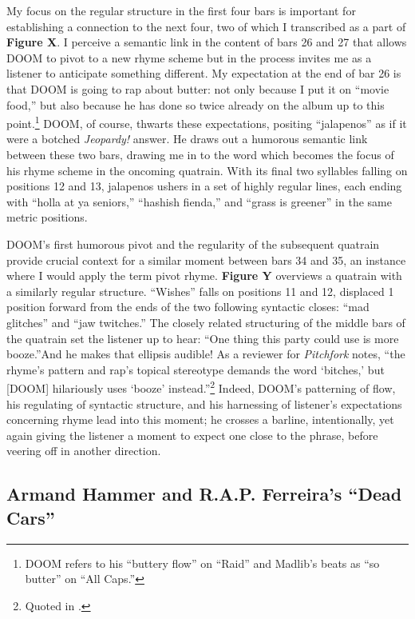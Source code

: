 My focus on the regular structure in the first four bars is important for establishing a connection
to the next four, two of which I transcribed as a part of \textbf{Figure X}. I perceive a semantic 
link in the content of bars 26 and 27 that allows DOOM to pivot to a new rhyme scheme but in the 
process invites me as a listener to anticipate something different. My expectation at the end of 
bar 26 is that DOOM is going to rap about butter: not only because I put it on ``movie food,'' but
also because he has done so twice already on the album up to this point.\footnote{
    DOOM refers to his ``buttery flow'' on ``Raid'' and Madlib's beats as ``so butter'' on ``All 
    Caps.''}
DOOM, of course, thwarts these expectations, positing ``jalapenos'' as if it were a botched 
\textit{Jeopardy!} answer. He draws out a humorous semantic link between these two bars, drawing
me in to the word which becomes the focus of his rhyme scheme in the oncoming quatrain. With its
final two syllables falling on positions 12 and 13, jalapenos ushers in a set of highly regular
lines, each ending with ``holla at ya seniors,'' ``hashish fienda,'' and ``grass is greener''
in the same metric positions.

DOOM's first humorous pivot and the regularity of the subsequent quatrain provide crucial context
for a similar moment between bars 34 and 35, an instance where I would apply the term pivot rhyme.
\textbf{Figure Y} overviews a quatrain with a similarly regular structure. ``Wishes'' falls on 
positions 11 and 12, displaced 1 position forward from the ends of the two following syntactic 
closes: ``mad glitches'' and ``jaw twitches.'' The closely related structuring of the middle bars
of the quatrain set the listener up to hear: ``One thing this party could use is more\textellipsis
booze.''And he makes that ellipsis audible! As a reviewer for \textit{Pitchfork} notes, ``the rhyme's 
pattern and rap's topical stereotype demands the word `bitches,' but [DOOM] hilariously uses `booze'
instead.''\footnote{
    Quoted in \cite{estellecaswellRappingDeconstructedBest2016}.}
Indeed, DOOM's patterning of flow, his regulating of syntactic structure, and his harnessing of
listener's expectations concerning rhyme lead into this moment; he crosses a barline, intentionally,
yet again giving the listener a moment to expect one close to the phrase, before veering off in 
another direction.

\subsection*{\centering Armand Hammer and R.A.P. Ferreira's ``Dead Cars''}


